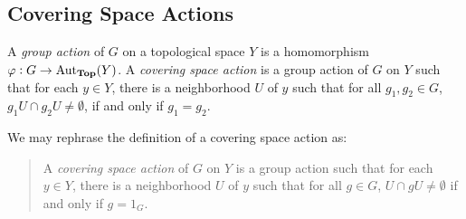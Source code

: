\subsection{Covering Space Actions}

\begin{definition}
    A \textit{group action} of $G$ on a topological space $Y$ is a homomorphism $\varphi: G\to\operatorname{Aut}_{\mathbf{Top}}(Y)$. A \textit{covering space action} is a group action of $G$ on $Y$ such that for each $y\in Y$, there is a neighborhood $U$ of $y$ such that for all $g_1,g_2\in G$, $g_1U\cap g_2U\ne\emptyset$, if and only if  $g_1 = g_2$.
\end{definition}

We may rephrase the definition of a covering space action as: 
\begin{quote}
    A \textit{covering space action} of $G$ on $Y$ is a group action such that for each $y\in Y$, there is a neighborhood $U$ of $y$ such that for all $g\in G$, $U\cap gU\ne\emptyset$ if and only if $g = 1_G$.
\end{quote}


